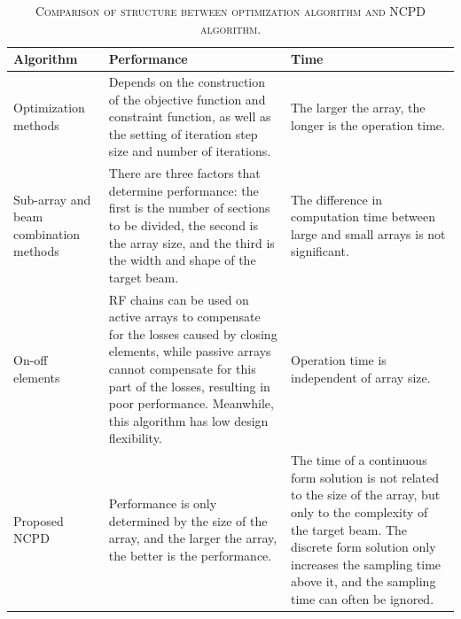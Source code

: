 \documentclass[12pt,draftclsnofoot,onecolumn]{IEEEtran}
\begin{document}
	
	\begin{table}[!httbp]
		\centering
		\caption{\textsc{Comparison of structure between optimization algorithm and NCPD algorithm.}}
		\begin{tabularx}{\textwidth}{|p{2.5cm}|p{6.7cm}|p{6cm}|}
			\toprule
			\textbf{ Algorithm } &  \textbf{Performance } & \textbf{Time }  \\
			\hline
			Optimization methods \cite{DBLP:journals/wcl/FanZH19,DBLP:journals/wcl/MaZZ22} & Depends on the construction of the objective function and constraint function, as well as the setting of iteration step size and number of iterations. & The larger the array, the longer is  the operation time.\\
			\hline
			Sub-array and beam combination methods \cite{DBLP:journals/wcl/YouZZ20,DBLP:journals/icl/SinghK22,DBLP:journals/twc/XiaoHXX16}  & There are three factors that determine performance: the first is the number of sections to be divided, the second is the array size, and the third is the width and shape of the target beam. & The difference in computation time between large and small arrays is not significant.  \\
			\hline
			On-off elements & RF chains can be used on active arrays to compensate for the losses caused by closing elements, while passive arrays cannot compensate for this part of the losses, resulting in poor performance. Meanwhile, this algorithm has low design flexibility. & Operation time is independent of array size.\\
			\hline
			Proposed NCPD & Performance is only determined by the size of the array, and the larger the array, the better is the performance. & The  time of a continuous form solution is not related to the size of the array, but only to the complexity of the target beam. The discrete form solution only increases the sampling time above it, and the sampling time can often be ignored. \\
			\bottomrule
		\end{tabularx}%
		\label{t2}%
		
	\end{table}%
	
	
	
	
\end{document}
